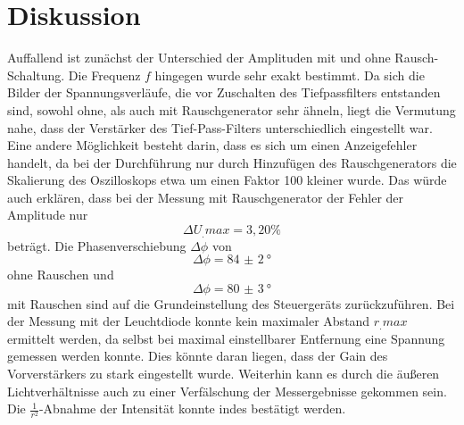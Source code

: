 \section{Diskussion}
\label{sec:Diskussion}
Auffallend ist zunächst der Unterschied der Amplituden mit und ohne Rausch-Schaltung.
Die Frequenz $f$ hingegen wurde sehr exakt bestimmt.
Da sich die Bilder der Spannungsverläufe, die vor Zuschalten des Tiefpassfilters entstanden sind, sowohl ohne, als auch mit Rauschgenerator sehr ähneln, liegt die Vermutung nahe, dass der Verstärker des Tief-Pass-Filters unterschiedlich eingestellt war.
Eine andere Möglichkeit besteht darin, dass es sich um einen Anzeigefehler handelt, da bei der Durchführung nur durch Hinzufügen des Rauschgenerators die Skalierung des Oszilloskops etwa um einen Faktor 100 kleiner wurde.
Das würde auch erklären, dass bei der Messung mit Rauschgenerator der Fehler der Amplitude nur
\[
\Delta U_.{max}= 3,20\%
\]
beträgt.
Die Phasenverschiebung $\Delta\phi$ von
\[
\Delta\phi = \SI{84(2)}{\degree}
\]
ohne Rauschen und
\[
\Delta\phi = \SI{80(3)}{\degree}
\]
mit Rauschen sind auf die Grundeinstellung des Steuergeräts zurückzuführen.
Bei der Messung mit der Leuchtdiode konnte kein maximaler Abstand $r_.{max}$ ermittelt werden, da selbst bei maximal einstellbarer Entfernung eine Spannung gemessen werden konnte.
Dies könnte daran liegen, dass der Gain des Vorverstärkers zu stark eingestellt wurde.
Weiterhin kann es durch die äußeren Lichtverhältnisse auch zu einer Verfälschung der Messergebnisse gekommen sein. Die $\frac{1}{r^2}$-Abnahme der Intensität konnte indes bestätigt werden.